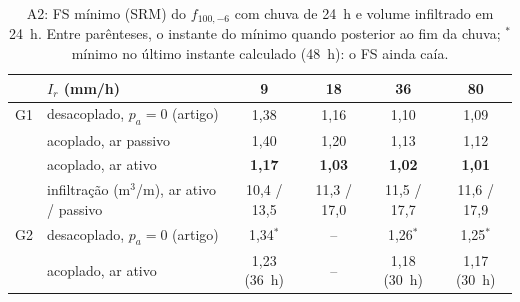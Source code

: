 \begin{table}[h!]
\centering\small
\caption{A2: FS m\'inimo (SRM) do $f_{100,-6}$ com chuva de 24~h e volume infiltrado em 24~h. Entre par\^enteses, o
instante do m\'inimo quando posterior ao fim da chuva; $^*$m\'inimo no \'ultimo instante calculado (48~h): o FS ainda
ca\'ia.}\label{tab:A2}
\begin{tabular}{llcccc}
\toprule
 & $I_r$ (mm/h) & 9 & 18 & 36 & 80\\
\midrule
G1 & desacoplado, $p_a=0$ (artigo) & 1,38 & 1,16 & 1,10 & 1,09\\
 & acoplado, ar passivo & 1,40 & 1,20 & 1,13 & 1,12\\
 & acoplado, ar ativo & \textbf{1,17} & \textbf{1,03} & \textbf{1,02} & \textbf{1,01}\\
 & infiltra\c{c}\~ao (m$^3$/m), ar ativo / passivo & 10,4 / 13,5 & 11,3 / 17,0 & 11,5 / 17,7 & 11,6 / 17,9\\
\midrule
G2 & desacoplado, $p_a=0$ (artigo) & 1,34$^*$ & -- & 1,26$^*$ & 1,25$^*$\\
 & acoplado, ar ativo & 1,23 (36~h) & -- & 1,18 (30~h) & 1,17 (30~h)\\
\bottomrule
\end{tabular}
\end{table}

